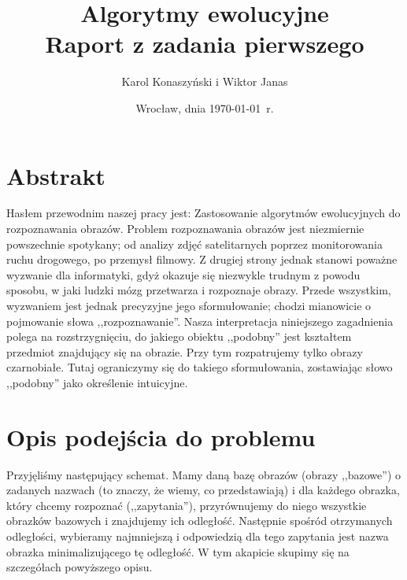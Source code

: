 \documentclass[a4paper,12pt,leqno]{article}
\title{\textbf{Algorytmy ewolucyjne}\\
       {\Large Raport z zadania pierwszego}\\[-1ex]}
\author{Karol Konaszyński i Wiktor Janas}
\date{Wrocław, dnia \today\ r.}
\begin{document}
\maketitle

\newcommand{\grad}{\mathrm{grad}}
\newcommand{\avg}{\mathrm{avg}}
\newcommand{\dist}{\mathrm{dist}}
\newcommand{\median}{\mathrm{median}}
\newcommand{\target}{\mathrm{target}}
\newcommand{\RETURN}{|return|\ }

\section{Abstrakt}

Hasłem przewodnim naszej pracy jest: Zastosowanie algorytmów ewolucyjnych do rozpoznawania obrazów. 
Problem rozpoznawania obrazów jest niezmiernie powszechnie spotykany; od analizy zdjęć satelitarnych poprzez monitorowania ruchu drogowego, po przemysł filmowy. 
Z drugiej strony jednak stanowi poważne wyzwanie dla informatyki, gdyż okazuje się niezwykle trudnym z powodu sposobu, 
w jaki ludzki mózg przetwarza i rozpoznaje obrazy. Przede wszystkim, wyzwaniem jest jednak precyzyjne jego sformułowanie; 
chodzi mianowicie o pojmowanie słowa ,,rozpoznawanie''. Nasza interpretacja niniejszego zagadnienia polega na rozstrzygnięciu, 
do jakiego obiektu ,,podobny'' jest kształtem przedmiot znajdujący się na obrazie. 
Przy tym rozpatrujemy tylko obrazy czarnobiałe. Tutaj ograniczymy się do takiego sformułowania, zostawiając słowo ,,podobny'' jako określenie intuicyjne. 

\section{Opis podejścia do problemu}
Przyjęliśmy następujący schemat. Mamy daną bazę obrazów (obrazy ,,bazowe'') o zadanych nazwach (to znaczy, że wiemy, co przedstawiają) 
i dla każdego obrazka, który chcemy rozpoznać (,,zapytania''), przyrównujemy do niego wszystkie obrazków bazowych i znajdujemy ich odległość. 
Następnie spośród otrzymanych odległości, wybieramy najmniejszą i odpowiedzią dla tego zapytania jest nazwa obrazka minimalizującego tę odległość.
W tym akapicie skupimy się na szczegółach powyższego opisu.
\end{document}
